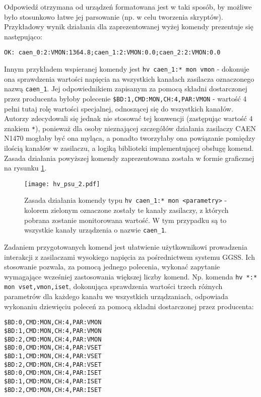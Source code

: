Odpowiedź otrzymana od urządzeń formatowana jest w taki sposób, by możliwe było stosunkowo łatwe jej parsowanie (np. w celu tworzenia skryptów). Przykładowy wynik działania dla zaprezentowanej wyżej komendy prezentuje się następująco:
\begin{lstlisting}
OK: caen_0:2:VMON:1364.8;caen_1:2:VMON:0.0;caen_2:2:VMON:0.0
\end{lstlisting}

Innym przykładem wspieranej komendy jest \lstinline{hv caen_1:* mon vmon} - dokonuje ona sprawdzenia wartości napięcia na wszystkich kanałach zasilacza oznaczonego nazwą \lstinline{caen_1}. Jej odpowiednikiem zapisanym za pomocą składni dostarczonej przez producenta byłoby polecenie \lstinline{$BD:1,CMD:MON,CH:4,PAR:VMON} - wartość 4 pełni tutaj rolę wartości specjalnej, odnoszącej się do wszystkich kanałów. Autorzy zdecydowali się jednak nie stosować tej konwencji (zastępując wartość 4 znakiem \lstinline{*}), ponieważ dla osoby nieznającej szczegółów działania zasilaczy CAEN N1470 mogłaby być ona myląca, a ponadto tworzyłaby ona powiązanie pomiędzy ilością kanałów w zasilaczu, a logiką biblioteki implementującej obsługę komend. Zasada działania powyższej komendy zaprezentowana została w formie graficznej na rysunku \ref{fig:psu2}.

\begin{figure}[H]
\centering
\texttt{[image: hv\_psu\_2.pdf]}
\caption{Zasada działania komendy typu \lstinline{hv caen_1:* mon <parametry>} - kolorem zielonym oznaczone zostały te kanały zasilaczy, z których pobrana zostanie monitorowana wartość. W tym przypadku są to wszystkie kanały urządzenia o nazwie \lstinline{caen_1}.}
\label{fig:psu2}
\end{figure}

Zadaniem przygotowanych komend jest ułatwienie użytkownikowi prowadzenia interakcji z zasilaczami wysokiego napięcia za pośrednictwem systemu GGSS. Ich stosowanie pozwala, za pomocą jednego polecenia, wykonać zapytanie wymagające wcześniej zastosowania większej liczby komend. Np. komenda \lstinline{hv *:* mon vset,vmon,iset}, dokonująca sprawdzenia wartości trzech różnych parametrów dla każdego kanału we wszystkich urządzaniach, odpowiada wykonaniu dziewięciu poleceń za pomocą składni dostarczonej przez producenta:
\begin{lstlisting}
$BD:0,CMD:MON,CH:4,PAR:VMON
$BD:1,CMD:MON,CH:4,PAR:VMON
$BD:2,CMD:MON,CH:4,PAR:VMON
$BD:0,CMD:MON,CH:4,PAR:VSET
$BD:1,CMD:MON,CH:4,PAR:VSET
$BD:2,CMD:MON,CH:4,PAR:VSET
$BD:0,CMD:MON,CH:4,PAR:ISET
$BD:1,CMD:MON,CH:4,PAR:ISET
$BD:2,CMD:MON,CH:4,PAR:ISET
\end{lstlisting}

